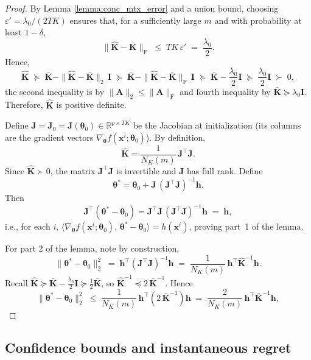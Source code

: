 \documentclass[pdflatex,sn-mathphys-num]{sn-jnl}%
\theoremstyle{thmstyleone}%
\theoremstyle{thmstyletwo}%
\theoremstyle{thmstylethree}%
\newcommand{\R}{\mathbb{R}}
\newcommand{\xbf}{\mathbf{x}}
\newcommand{\Kbf}{\mathbf{K}}
\newcommand{\Ibf}{\mathbf{I}}
\newcommand{\hbf}{\mathbf{h}}
\newcommand{\Jbf}{\mathbf{J}}
\newcommand{\thetabf}{\bm{\theta}}
\begin{document}
\begin{appendices}
\begin{proof}
By Lemma \ref{lemma:conc_mtx_error} and a union bound, choosing $\varepsilon'=\lambda_0/(2TK)$ ensures that, for a sufficiently large $m$ and with probability at least $1-\delta$,
\[
\|\hat{\mathbf{K}}-\bar{\mathbf{K}}\|_{\mathrm{F}}  \;\le\; TK\,\varepsilon' \;=\; \frac{\lambda_0}{2}.
\]
Hence, %
\[
\hat{\mathbf{K}} \;\succeq\; \bar{\mathbf{K}} - \|\hat{\mathbf{K}}-\bar{\mathbf{K}}\|_2\,\Ibf
\;\succeq\; \bar{\mathbf{K}} - \|\hat{\mathbf{K}}-\bar{\mathbf{K}}\|_{\mathrm{F}}\,\Ibf
\;\succeq\; \bar{\mathbf{K}} - \frac{\lambda_0}{2}\Ibf
\;\succeq\; \frac{\lambda_0}{2}\Ibf \;\succ\; 0,
\]
the second inequality is by $\|\mathbf{A}\|_2\le\|\mathbf{A}\|_{\mathrm{F}}$ and fourth inequality by $\bar{\mathbf{K}}\succeq \lambda_0 \Ibf$.
Therefore, $\hat{\mathbf{K}}$ is positive definite.

Define $\Jbf=\Jbf_0=\Jbf({\thetabf}_0)\in\R^{p\times TK}$ be the Jacobian at initialization (its columns are the gradient vectors $\nabla_{\thetabf} f(\xbf^i;{\thetabf}_0)$). By definition,
\[
\hat{\mathbf{K}} = \frac{1}{N_K(m)}\,\Jbf^\top \Jbf.
\]
Since $\hat{\mathbf{K}}\succ 0$, the matrix $\Jbf^\top \Jbf$ is invertible and $\Jbf$ has full rank. Define
\[
{\thetabf}^* = {\thetabf}_0+\Jbf\,(\Jbf^\top \Jbf)^{-1} \hbf.
\]
Then
\[
\Jbf^\top({\thetabf}^*-{\thetabf}_0) = \Jbf^\top \Jbf\,(\Jbf^\top \Jbf)^{-1} \hbf \;=\; \hbf,
\]
i.e., for each $i$, $\langle \nabla_{\thetabf} f(\xbf^i;{\thetabf}_0),\,{\thetabf}^*-{\thetabf}_0\rangle = h(\xbf^i)$, proving part~1 of the lemma.

For part 2 of the lemma, note by construction,
\[
\|{\thetabf}^*-{\thetabf}_0\|_2^2
\;=\; \hbf^\top (\Jbf^\top \Jbf)^{-1} \hbf
\;=\; \frac{1}{N_K(m)}\, \hbf^\top \hat{\mathbf{K}}^{-1} \hbf.
\]
Recall $\hat{\mathbf{K}} \succeq \bar{\Kbf}-\frac{\lambda_0}{2} \Ibf \succeq \frac12 \bar{\Kbf}$, so $\hat{\mathbf{K}}^{-1} \preceq 2\,\bar{\mathbf{K}}^{-1}$. Hence
\[
\|{\thetabf}^*-{\thetabf}_0\|_2^2 \;\le\; \frac{1}{N_K(m)}\, \hbf^\top (2\,\bar{\mathbf{K}}^{-1}) \hbf
\;=\; \frac{2}{N_K(m)}\, \hbf^\top \bar{\mathbf{K}}^{-1} \hbf,
\]
\end{proof}












\subsection{Confidence bounds and instantaneous regret}


\end{appendices}
\end{document}
